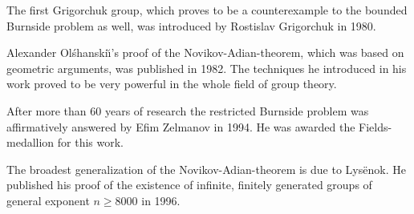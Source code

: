 The first Grigorchuk group, which proves to be a counterexample to the bounded Burnside problem as well, was introduced by Rostislav Grigorchuk in 1980.

Alexander Olśhanski\u\i's proof of the Novikov-Adian-theorem, which was based on geometric arguments, was published in 1982. The techniques he introduced in his work proved to be very powerful in the whole field of group theory.

After more than 60 years of research the restricted Burnside problem was affirmatively answered by Efim Zelmanov in 1994. He was awarded the Fields-medallion for this work.

The broadest generalization of the Novikov-Adian-theorem is due to Lys\"{e}nok. He published his proof of the existence of infinite, finitely generated groups of general exponent $n\geq 8000$ in 1996.